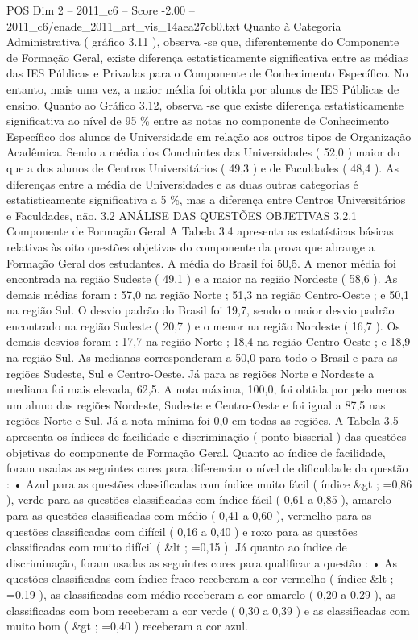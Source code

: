 \begin{textsample}{POS Dim 2 – 2011\_c6 – Score -2.00 – 2011\_c6/enade\_2011\_art\_vis\_14aea27cb0.txt}
Quanto à Categoria Administrativa ( gráfico 3.11 ), observa -se que, diferentemente do Componente de Formação Geral, existe diferença estatisticamente significativa entre as médias das IES Públicas e Privadas para o Componente de Conhecimento Específico.
No entanto, mais uma vez, a maior média foi obtida por alunos de IES Públicas de ensino.
Quanto ao Gráfico 3.12, observa -se que existe diferença estatisticamente significativa ao nível de 95 \% entre as notas no componente de Conhecimento Específico dos alunos de Universidade em relação aos outros tipos de Organização Acadêmica.
Sendo a média dos Concluintes das Universidades ( 52,0 ) maior do que a dos alunos de Centros Universitários ( 49,3 ) e de Faculdades ( 48,4 ).
As diferenças entre a média de Universidades e as duas outras categorias é estatisticamente significativa a 5 \%, mas a diferença entre Centros Universitários e Faculdades, não. 3.2 ANÁLISE DAS QUESTÕES OBJETIVAS 3.2.1 Componente de Formação Geral A Tabela 3.4 apresenta as estatísticas básicas relativas às oito questões objetivas do componente da prova que abrange a Formação Geral dos estudantes.
A média do Brasil foi 50,5.
A menor média foi encontrada na região Sudeste ( 49,1 ) e a maior na região Nordeste ( 58,6 ).
As demais médias foram : 57,0 na região Norte ; 51,3 na região Centro-Oeste ; e 50,1 na região Sul.
O desvio padrão do Brasil foi 19,7, sendo o maior desvio padrão encontrado na região Sudeste ( 20,7 ) e o menor na região Nordeste ( 16,7 ).
Os demais desvios foram : 17,7 na região Norte ; 18,4 na região Centro-Oeste ; e 18,9 na região Sul.
As medianas corresponderam a 50,0 para todo o Brasil e para as regiões Sudeste, Sul e Centro-Oeste.
Já para as regiões Norte e Nordeste a mediana foi mais elevada, 62,5.
A nota máxima, 100,0, foi obtida por pelo menos um aluno das regiões Nordeste, Sudeste e Centro-Oeste e foi igual a 87,5 nas regiões Norte e Sul.
Já a nota mínima foi 0,0 em todas as regiões.
A Tabela 3.5 apresenta os índices de facilidade e discriminação ( ponto bisserial ) das questões objetivas do componente de Formação Geral.
Quanto ao índice de facilidade, foram usadas as seguintes cores para diferenciar o nível de dificuldade da questão : • Azul para as questões classificadas com índice muito fácil ( índice \&gt ; =0,86 ), verde para as questões classificadas com índice fácil ( 0,61 a 0,85 ), amarelo para as questões classificadas com médio ( 0,41 a 0,60 ), vermelho para as questões classificadas com difícil ( 0,16 a 0,40 ) e roxo para as questões classificadas com muito difícil ( \&lt ; =0,15 ).
Já quanto ao índice de discriminação, foram usadas as seguintes cores para qualificar a questão : • As questões classificadas com índice fraco receberam a cor vermelho ( índice \&lt ; =0,19 ), as classificadas com médio receberam a cor amarelo ( 0,20 a 0,29 ), as classificadas com bom receberam a cor verde ( 0,30 a 0,39 ) e as classificadas com muito bom ( \&gt ; =0,40 ) receberam a cor azul.

\end{textsample}
